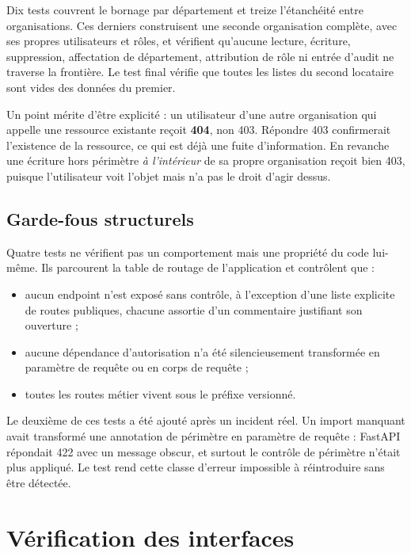 Dix tests couvrent le bornage par département et treize l'étanchéité entre
organisations. Ces derniers construisent une seconde organisation complète, avec ses
propres utilisateurs et rôles, et vérifient qu'aucune lecture, écriture, suppression,
affectation de département, attribution de rôle ni entrée d'audit ne traverse la
frontière. Le test final vérifie que toutes les listes du second locataire sont vides
des données du premier.

Un point mérite d'être explicité : un utilisateur d'une autre organisation qui appelle
une ressource existante reçoit \textbf{404}, non 403. Répondre 403 confirmerait
l'existence de la ressource, ce qui est déjà une fuite d'information. En revanche une
écriture hors périmètre \emph{à l'intérieur} de sa propre organisation reçoit bien 403,
puisque l'utilisateur voit l'objet mais n'a pas le droit d'agir dessus.

\subsection{Garde-fous structurels}

Quatre tests ne vérifient pas un comportement mais une propriété du code lui-même. Ils
parcourent la table de routage de l'application et contrôlent que :

\begin{itemize}
  \item aucun endpoint n'est exposé sans contrôle, à l'exception d'une liste explicite
    de routes publiques, chacune assortie d'un commentaire justifiant son ouverture ;
  \item aucune dépendance d'autorisation n'a été silencieusement transformée en
    paramètre de requête ou en corps de requête ;
  \item toutes les routes métier vivent sous le préfixe versionné.
\end{itemize}

Le deuxième de ces tests a été ajouté après un incident réel. Un import manquant avait
transformé une annotation de périmètre en paramètre de requête : FastAPI répondait 422
avec un message obscur, et surtout le contrôle de périmètre n'était plus appliqué. Le
test rend cette classe d'erreur impossible à réintroduire sans être détectée.

\section{Vérification des interfaces}

